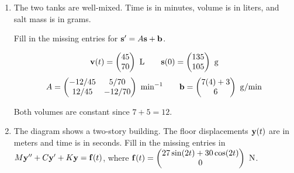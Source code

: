 \documentclass[11pt,letterpaper]{article}
\newenvironment{answerarea}{%
  \par\noindent\begin{lrbox}{\AnswerAreaBox}\begin{minipage}{\dimexpr\linewidth-2\fboxsep-2\fboxrule\relax}%
  \setlength{\abovedisplayskip}{4pt}\setlength{\belowdisplayskip}{4pt}%
  \setlength{\abovedisplayshortskip}{4pt}\setlength{\belowdisplayshortskip}{4pt}%
}{%
  \end{minipage}\end{lrbox}\fbox{\usebox{\AnswerAreaBox}}\par
}
\begin{document}
\begin{enumerate}
\item The two tanks are well-mixed. Time is in minutes, volume is in liters,
and salt mass is in grams.

\noindent{}

Fill in the missing entries for $\mathbf{s}'=A\mathbf{s}+\mathbf{b}$.
\begin{answerarea}
\[
\vect{v}(t)=\begin{pmatrix}45\\70\end{pmatrix}\ \mathrm{L}
\qquad
\vect{s}(0)=\begin{pmatrix}135\\105\end{pmatrix}\ \mathrm{g}
\]
\[
A=\begin{pmatrix}-12/45&5/70\\12/45&-12/70\end{pmatrix}
  \ \mathrm{min}^{-1}
\qquad
\vect{b}=\begin{pmatrix}7(4)+3\\6\end{pmatrix}\ \mathrm{g/min}
\]

\end{answerarea}
{\footnotesize Both volumes are constant since $7+5=12$.}
\vfill
\item The diagram shows a two-story building. The floor displacements
$\mathbf{y}(t)$ are in meters and time is in seconds. Fill in the missing
entries in $M\mathbf{y}''+C\mathbf{y}'+K\mathbf{y}=\mathbf{f}(t)$, where
$\vect{f}(t)=\begin{pmatrix}27\sin(2t)+30\cos(2t)\\0\end{pmatrix}\ \mathrm{N}$.


\end{enumerate}
\end{document}

